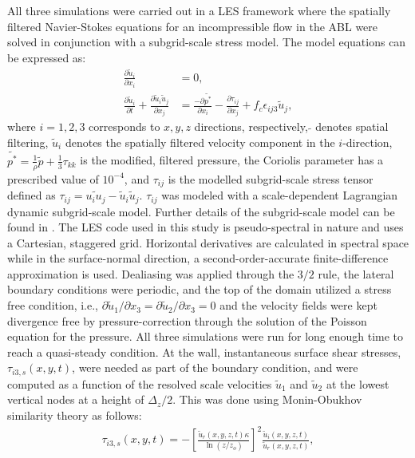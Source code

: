 All three simulations were carried out in a LES framework where the spatially filtered Navier-Stokes equations for an incompressible flow in the ABL were solved in conjunction with a subgrid-scale stress model. The model equations can be expressed as: 
\begin{align}
    \frac{\partial \tilde{u}_i}{\partial x_{i}} &= 0, \\
    \frac{\partial \tilde{u}_i}{\partial t}+ \frac{\partial \tilde{u}_i\tilde{u}_j}{\partial x_{j}}  &= \frac{-\partial \tilde{p^*}}{\partial x_i}-\frac{\partial \tau_{ij}}{\partial x_j}+ f_{c}\epsilon_{ij3}\tilde{u}_{j},   
\label{eqn:les_eqn}    
\end{align}
\noindent where $i={1,2,3}$ corresponds to $x,y,z$ directions, respectively, ${\tilde{}}$ denotes spatial filtering, $\tilde{u}_i$ denotes the spatially filtered velocity component in the $i$-direction, $\tilde{p^*}=\frac{1}{\rho} \tilde{p}+\frac{1}{3}\tau_{kk}$ is the modified, filtered pressure, the Coriolis parameter has a prescribed value of $10^{-4}$, and $\tau_{ij}$ is the modelled subgrid-scale stress tensor defined as $\tau_{ij}=\widetilde{u_i u_j}-\tilde{u}_i\tilde{u}_j$. $\tau_{ij}$ was modeled with a scale-dependent Lagrangian dynamic subgrid-scale model. Further details of the subgrid-scale model can be found in \citet{stoll_wrr_2006}. The LES code used in this study is pseudo-spectral in nature and uses a Cartesian, staggered grid. Horizontal derivatives are calculated in spectral space while in the surface-normal direction, a second-order-accurate finite-difference approximation is used. Dealiasing was applied through the $3/2$ rule, the lateral boundary conditions were periodic, and the top of the domain utilized a stress free condition, i.e., $\partial\tilde{u}_1/\partial x_3 = \partial \tilde{u}_2/\partial x_3=0$ and the velocity fields were kept divergence free by pressure-correction through the solution of the Poisson equation for the pressure.  All three simulations were run for long enough time to reach a quasi-steady condition. At the wall, instantaneous surface shear stresses, $\tau_{i3,s}(x,y,t)$, were needed as part of the boundary condition, and were computed as a function of the resolved scale velocities $\tilde{u}_1$ and $\tilde{u}_2$ at the lowest vertical nodes at a height of $\Delta_z/2$. This was done using Monin-Obukhov similarity theory as follows:
\begin{align}
\tau_{i3,s}(x,y,t) = -\left [ \frac{\tilde{u}_r(x,y,z,t)\kappa}{\ln(z/z_o)} \right ]^2\frac{\tilde{u}_i(x,y,z,t)}{\tilde{u}_r(x,y,z,t)}, 
\end{align}
